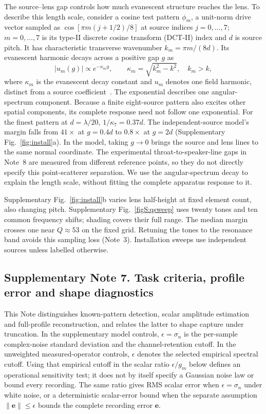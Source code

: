 \documentclass[pdflatex,sn-nature]{sn-jnl}%
\begin{document}
The source--lens gap controls how much evanescent structure reaches the lens. To describe this length scale, consider a cosine test pattern $\phi_m$, a unit-norm drive vector sampled as
$\cos[\pi m(j+1/2)/8]$ at source indices $j=0,\ldots,7$; $m=0,\ldots,7$
is its type-II discrete cosine transform (DCT-II) index and $d$ is source pitch. It has characteristic transverse wavenumber
$k_m=\pi m/(8d)$. Its evanescent harmonic decays across a positive gap $g$ as
\begin{equation}
 |u_m(g)|\propto e^{-\kappa_mg},\qquad
 \kappa_m=\sqrt{k_m^2-k^2},\quad k_m>k,
 \label{eq:evan}
\end{equation}
where $\kappa_m$ is the evanescent decay constant and $u_m$ denotes one field harmonic, distinct from a source coefficient~\cite{williams1999,maynard1985}. The exponential describes one angular-spectrum component. Because a finite eight-source pattern also excites other spatial components, its complete response need not follow one exponential.
For the finest pattern at $d=\lambda/20$, $1/\kappa_7=0.37d$.
The independent-source model's margin falls from $41\times$ at $g=0.4d$
to $0.8\times$ at $g=2d$ (Supplementary Fig.~\ref{fig:install}a).
In the model, taking $g\to0$ brings the source and lens lines to the same normal coordinate. The experimental throat-to-speaker-line gaps in Note~8 are measured from different reference points, so they do not directly specify this point-scatterer separation. We use the angular-spectrum decay to explain the length scale, without fitting the complete apparatus response to it.

Supplementary Fig.~\ref{fig:install}b varies lens half-height at fixed
element count, also changing pitch. Supplementary Fig.~\ref{figS:qsweep}
uses twenty tones and ten common frequency shifts; shading covers their
full range. The median margin crosses one near $Q\approx53$ on the fixed
grid. Retuning the tones to the resonance band avoids this sampling loss
(Note~3). Installation sweeps use independent sources unless labelled otherwise.


\subsection*{Supplementary Note 7. Task criteria, profile error and shape diagnostics}

This Note distinguishes known-pattern detection, scalar amplitude estimation and full-profile reconstruction, and relates the latter to shape capture under truncation. In the supplementary model controls, $\epsilon=\sigma_n$ is the per-sample complex-noise standard deviation and the channel-retention cutoff. In the unweighted measured-operator controls, $\epsilon$ denotes the selected empirical spectral cutoff. Using that empirical cutoff in the scalar ratio $\epsilon/g_m$ below defines an operational sensitivity test; it does not by itself specify a Gaussian noise law or bound every recording. The same ratio gives RMS scalar error when $\epsilon=\sigma_n$ under white noise, or a deterministic scalar-error bound when the separate assumption $\|\bm e\|\le\epsilon$ bounds the complete recording error $\bm e$.
\end{document}
